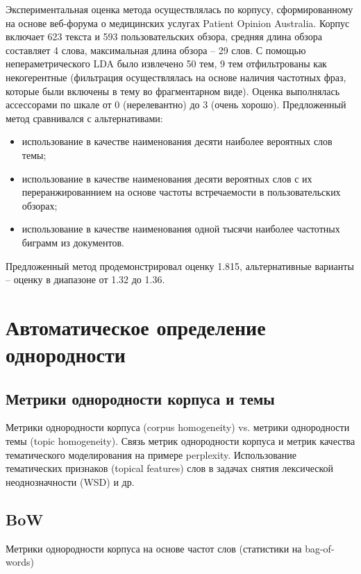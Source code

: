 Экспериментальная оценка метода осуществлялась по корпусу, сформированному на основе веб-форума о медицинских услугах Patient Opinion Australia. Корпус включает 623 текста и 593 пользовательских обзора, средняя длина обзора составляет 4 слова, максимальная длина обзора -- 29 слов. С помощью непераметрического LDA было извлечено 50 тем, 9 тем отфильтрованы как некогерентные (фильтрация осуществлялась на основе наличия частотных фраз, которые были включены в тему во фрагментарном виде). Оценка выполнялась ассессорами по шкале от 0 (нерелевантно) до 3 (очень хорошо). Предложенный метод сравнивался с альтернативами: 
\begin{itemize}
    \item использование в качестве наименования десяти наиболее вероятных слов темы;
    \item использование в качестве наименования десяти вероятных слов с их переранжированнием на основе частоты встречаемости в пользовательских обзорах;
    \item использование в качестве наименования одной тысячи наиболее частотных биграмм из документов.
\end{itemize} 
\noindent Предложенный метод продемонстрировал оценку 1.815, альтернативные варианты -- оценку в диапазоне от 1.32 до 1.36.

 






\chapter{Автоматическое определение однородности}

\section{Метрики однородности корпуса и темы}

Метрики однородности корпуса (corpus homogeneity) vs. метрики однородности темы (topic homogeneity). Связь метрик однородности корпуса и метрик качества тематического моделирования на примере perplexity. Использование тематических признаков (topical features) слов в задачах снятия лексической неоднозначности (WSD) и др.

\section{BoW}

Метрики однородности корпуса на основе частот слов (статистики на bag-of-words)

